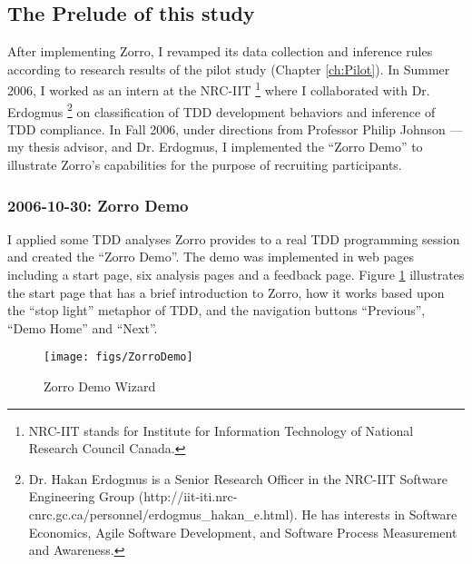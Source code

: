 \subsection{The Prelude of this study}
\label{sec:Industry-Journal-Inception}
After implementing Zorro, I revamped its data collection and inference rules according to research results of the pilot study (Chapter \ref{ch:Pilot}). In Summer 2006, I worked as an intern at the NRC-IIT \footnote{NRC-IIT stands for Institute for Information Technology of National Research Council Canada.} where I collaborated with Dr. Erdogmus \footnote{Dr. Hakan Erdogmus is a Senior Research Officer in the NRC-IIT Software Engineering Group (http://iit-iti.nrc-cnrc.gc.ca/personnel/erdogmus\_hakan\_e.html). He has interests in Software Economics, Agile Software Development, and Software Process Measurement and Awareness.} on classification of TDD development behaviors and inference of TDD compliance. In Fall 2006, under directions from Professor Philip Johnson --- my thesis advisor, and Dr. Erdogmus, I implemented the ``Zorro Demo'' to illustrate Zorro's capabilities for the purpose of recruiting participants.  

\subsubsection{2006-10-30: Zorro Demo}
I applied some TDD analyses Zorro provides to a real TDD programming session and created the ``Zorro Demo''. The demo was implemented in web pages including a start page, six analysis pages and a feedback page. Figure \ref{fig:ZorroDemo} illustrates the start page that has a brief introduction to Zorro, how it works based upon the ``stop light'' metaphor of TDD, and the navigation buttons ``Previous'', ``Demo Home'' and ``Next''.  

\begin{figure}[htbp]
  \centering
  \texttt{[image: figs/ZorroDemo]}
  \caption{Zorro Demo Wizard}
  \label{fig:ZorroDemo}
\end{figure}

\newpage

